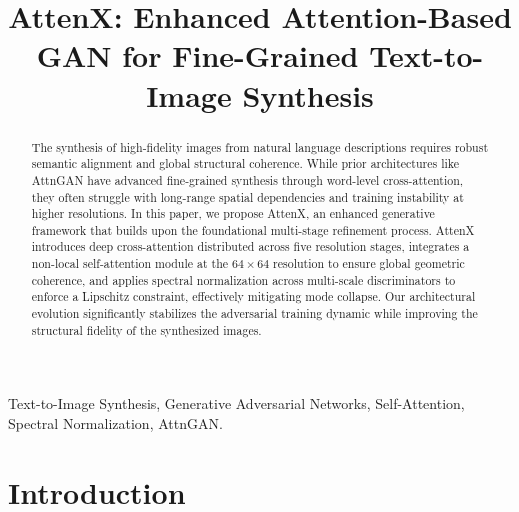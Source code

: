 \documentclass[conference]{IEEEtran}
\begin{document}
\title{AttenX: Enhanced Attention-Based GAN for Fine-Grained Text-to-Image Synthesis}

\author{
}

\maketitle

\begin{abstract}
The synthesis of high-fidelity images from natural language descriptions requires robust semantic alignment and global structural coherence. While prior architectures like AttnGAN have advanced fine-grained synthesis through word-level cross-attention, they often struggle with long-range spatial dependencies and training instability at higher resolutions. In this paper, we propose AttenX, an enhanced generative framework that builds upon the foundational multi-stage refinement process. AttenX introduces deep cross-attention distributed across five resolution stages, integrates a non-local self-attention module at the $64 \times 64$ resolution to ensure global geometric coherence, and applies spectral normalization across multi-scale discriminators to enforce a Lipschitz constraint, effectively mitigating mode collapse. Our architectural evolution significantly stabilizes the adversarial training dynamic while improving the structural fidelity of the synthesized images.
\end{abstract}

\begin{IEEEkeywords}
Text-to-Image Synthesis, Generative Adversarial Networks, Self-Attention, Spectral Normalization, AttnGAN.
\end{IEEEkeywords}

\section{Introduction}
\end{document}
